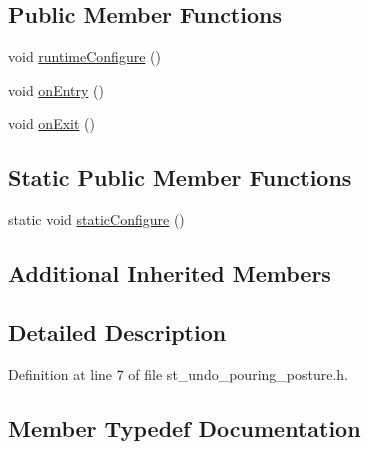 \subsection*{Public Member Functions}
\begin{DoxyCompactItemize}
\item 
void \hyperlink{structsm__fetch__two__table__whiskey__pour_1_1StPouringUndoPosture_ad0849650548663c539bf3fc1b9c236d8}{runtime\+Configure} ()
\item 
void \hyperlink{structsm__fetch__two__table__whiskey__pour_1_1StPouringUndoPosture_a2f07621303047092bc4eec64661a22d6}{on\+Entry} ()
\item 
void \hyperlink{structsm__fetch__two__table__whiskey__pour_1_1StPouringUndoPosture_ab9a1d47411e9d5e38b3879fb942e8dfc}{on\+Exit} ()
\end{DoxyCompactItemize}
\subsection*{Static Public Member Functions}
\begin{DoxyCompactItemize}
\item 
static void \hyperlink{structsm__fetch__two__table__whiskey__pour_1_1StPouringUndoPosture_a9824b7226fb82ff7c1f36cefa5bff905}{static\+Configure} ()
\end{DoxyCompactItemize}
\subsection*{Additional Inherited Members}


\subsection{Detailed Description}


Definition at line 7 of file st\+\_\+undo\+\_\+pouring\+\_\+posture.\+h.



\subsection{Member Typedef Documentation}
\mbox{\label{structsm__fetch__two__table__whiskey__pour_1_1StPouringUndoPosture_aed162ee53c7400df32cc8cea722d41a3}} 
